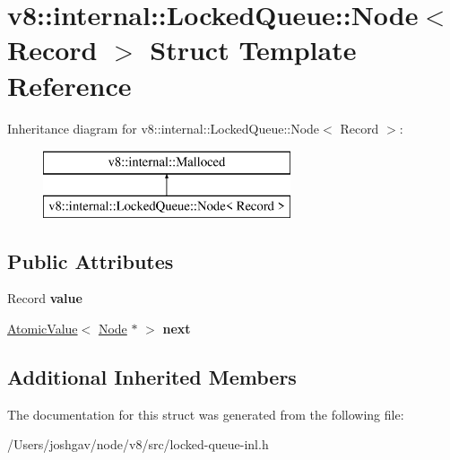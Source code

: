 \hypertarget{structv8_1_1internal_1_1_locked_queue_1_1_node}{}\section{v8\+:\+:internal\+:\+:Locked\+Queue\+:\+:Node$<$ Record $>$ Struct Template Reference}
\label{structv8_1_1internal_1_1_locked_queue_1_1_node}
Inheritance diagram for v8\+:\+:internal\+:\+:Locked\+Queue\+:\+:Node$<$ Record $>$\+:\begin{figure}[H]
\begin{center}
\leavevmode
\includegraphics[height=2.000000cm]{structv8_1_1internal_1_1_locked_queue_1_1_node}
\end{center}
\end{figure}
\subsection*{Public Attributes}
\begin{DoxyCompactItemize}
\item 
Record {\bfseries value}\hypertarget{structv8_1_1internal_1_1_locked_queue_1_1_node_ac5c407f19cd806a59101e78837ee5bb3}{}\label{structv8_1_1internal_1_1_locked_queue_1_1_node_ac5c407f19cd806a59101e78837ee5bb3}

\item 
\hyperlink{classv8_1_1internal_1_1_atomic_value}{Atomic\+Value}$<$ \hyperlink{structv8_1_1internal_1_1_locked_queue_1_1_node}{Node} $\ast$ $>$ {\bfseries next}\hypertarget{structv8_1_1internal_1_1_locked_queue_1_1_node_aaee8682189af201d81abad6f618f145d}{}\label{structv8_1_1internal_1_1_locked_queue_1_1_node_aaee8682189af201d81abad6f618f145d}

\end{DoxyCompactItemize}
\subsection*{Additional Inherited Members}


The documentation for this struct was generated from the following file\+:\begin{DoxyCompactItemize}
\item 
/\+Users/joshgav/node/v8/src/locked-\/queue-\/inl.\+h\end{DoxyCompactItemize}
